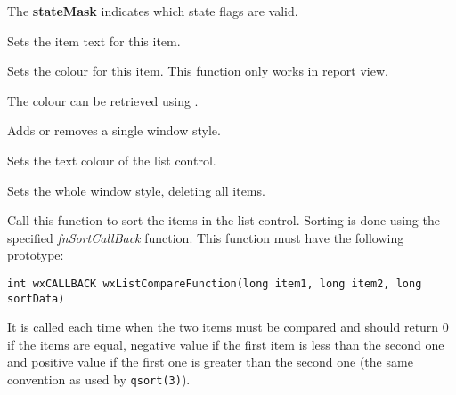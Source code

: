 The {\bf stateMask} indicates which state flags are valid.


\label{wxlistctrlsetitemtext}


Sets the item text for this item.


\label{wxlistctrlsetitemtextcolour}


Sets the colour for this item. This function only works in report view.

The colour can be retrieved using
.


\label{wxlistctrlsetsinglestyle}


Adds or removes a single window style.


\label{wxlistctrlsettextcolour}


Sets the text colour of the list control.


\label{wxlistctrlsetwindowstyleflag}


Sets the whole window style, deleting all items.

\label{wxlistctrlsortitems}


Call this function to sort the items in the list control. Sorting is done
using the specified {\it fnSortCallBack} function. This function must have the
following prototype:

\begin{verbatim}
int wxCALLBACK wxListCompareFunction(long item1, long item2, long sortData)
\end{verbatim}

It is called each time when the two items must be compared and should return 0
if the items are equal, negative value if the first item is less than the
second one and positive value if the first one is greater than the second one
(the same convention as used by {\tt qsort(3)}).

